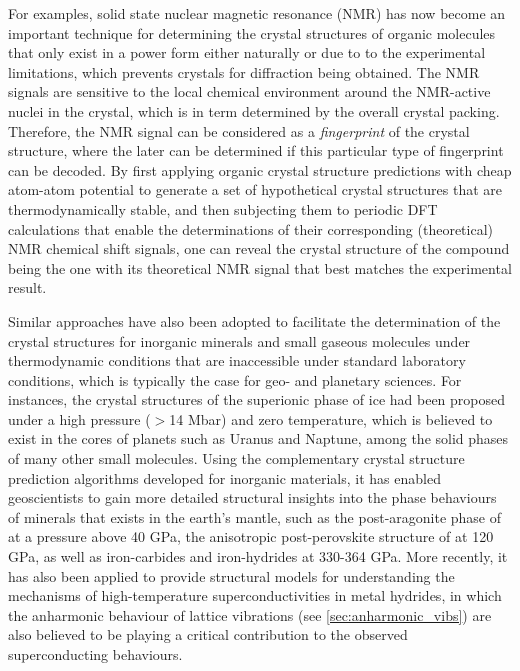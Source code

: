 For examples, solid state nuclear magnetic resonance (NMR)\cite{hodgkinson2020nmr} has now become an important technique for determining the crystal structures of organic molecules that only exist in a power form either naturally or due to to the experimental limitations, which prevents crystals for diffraction being obtained. The NMR signals are sensitive to the local chemical environment around the NMR-active nuclei in the crystal, which is in term determined by the overall crystal packing. Therefore, the NMR signal can be considered as a \emph{fingerprint} of the crystal structure, where the later can be determined if this particular type of fingerprint can be decoded. By first applying organic crystal structure predictions\cite{price2014predicting} with cheap atom-atom potential to generate a  set of hypothetical crystal structures that are thermodynamically stable, and then subjecting them to periodic DFT calculations that enable the determinations of their corresponding (theoretical) NMR chemical shift signals,\cite{van1993first,ashbrook2016combining} one can reveal the crystal structure of the compound being the one with its theoretical NMR signal that best matches the experimental result.\cite{baias2013novo,selent2017clathrate} 

Similar approaches have also been adopted to facilitate the determination of the crystal structures for inorganic minerals and small gaseous molecules under thermodynamic conditions that are inaccessible under standard laboratory conditions, which is typically the case for geo- and planetary sciences.\cite{wang2014perspective} For instances, the crystal structures of the superionic phase of ice\cite{wang2011high} had been proposed under a high pressure ($>$14 Mbar) and zero temperature, which is believed to exist in the cores of planets such as Uranus and Naptune,\cite{guillot1999interiors} among the solid phases of many other small molecules.\cite{han2019predicting,cable2020properties,ennis2020mixed,maynard2022crystal} Using the complementary crystal structure prediction algorithms developed for inorganic materials,\cite{glass2006uspex} it has enabled geoscientists to gain more detailed structural insights into the phase behaviours of minerals that exists in the earth's mantle, such as the post-aragonite phase of  at a pressure above 40 GPa,\cite{oganov2006high} the anisotropic post-perovskite structure of  at 120 GPa,\cite{oganov2004theoretical} as well as iron-carbides and iron-hydrides at 330-364 GPa.\cite{bazhanova2012fe} More recently, it has also been applied to provide structural models for understanding the mechanisms of high-temperature superconductivities in metal hydrides,\cite{salke2019synthesis,troyan2021anomalous,chen2021high} in which the anharmonic behaviour of lattice vibrations (see \cref{sec:anharmonic_vibs}) are also believed to be playing a critical contribution to the observed superconducting behaviours. 

